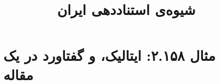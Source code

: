 \documentclass[a4paper,10pt]{article}
\begin{document}
\title{شیوه‌ی استناددهی ایران
 }
\author{}
\date{}
\maketitle



\section*{مثال ۲.۱۵۸: ایتالیک، و گفتاورد در یک مقاله}

\cite{سمیعی1384}\\
\cite{سرشار1385}\\
\cite{connell1982}\\
\cite{loomis1960}\\





\end{document}
